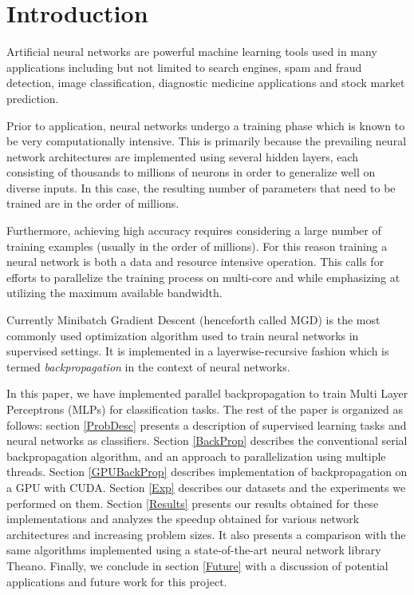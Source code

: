 \section{Introduction}
\label{Intro}

Artificial neural networks are powerful machine learning tools used in many applications including but not limited to search engines, spam and fraud detection, image classification, diagnostic medicine applications and stock market prediction.

Prior to application, neural networks undergo a training phase which is known to be very computationally intensive. This is primarily because the prevailing neural network architectures are implemented using several hidden layers, each consisting of thousands to millions of neurons in order to generalize well on diverse inputs. In this case, the resulting number of parameters that need to be trained are in the order of millions.

Furthermore, achieving high accuracy requires considering a large number of training examples (usually in the order of millions). For this reason training a neural network is both a data and resource intensive operation. This calls for efforts to parallelize the training process on multi-core and while emphasizing at utilizing the maximum available bandwidth.

Currently Minibatch Gradient Descent (henceforth called MGD) is the most commonly used optimization algorithm used to train neural networks in supervised settings. It is implemented in a layerwise-recursive fashion which is termed \textit{backpropagation} in the context of neural networks.

In this paper, we have implemented parallel backpropagation to train Multi Layer Perceptrons (MLPs) for classification tasks.
The rest of the paper is organized as follows: section \ref{ProbDesc} presents a description of supervised learning tasks and neural networks as classifiers. Section \ref{BackProp} describes the conventional serial backpropagation algorithm, and an approach to parallelization using multiple threads. Section \ref{GPUBackProp} describes implementation of backpropagation on a GPU with CUDA. Section \ref{Exp} describes our datasets and the experiments we performed on them. Section \ref{Results} presents our results obtained for these implementations and analyzes the speedup obtained for various network architectures and increasing problem sizes. It also presents a comparison with the same algorithms implemented using a state-of-the-art neural network library Theano. Finally, we conclude in section \ref{Future} with a discussion of potential applications and future work for this project.